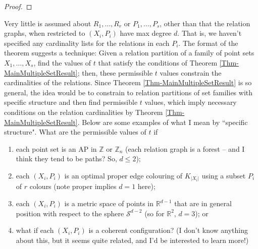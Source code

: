 \documentclass[12pt]{article}
\newcommand{\R}{\mathbb{R}}
\newcommand{\Z}{\mathbb{Z}}
\DeclarePairedDelimiter\ceil{\lceil}{\rceil}
\DeclarePairedDelimiter\floor{\lfloor}{\rfloor}
\theoremstyle{definition}
\begin{document}
\begin{proof}
	\end{proof}
	
	Very little is assumed about $R_1,\ldots, R_r$ or $P_1,\ldots, P_s$, other than that the relation graphs, when restricted to $(X_i,P_i)$ have max degree $d$.  That is, we haven't specified any cardinality lists for the relations in each $P_i$.  The format of the theorem suggests a technique: Given a relation partition of a family of point sets $X_1, \ldots, X_s$, find the values of $t$ that satisfy the conditions of Theorem \ref{Thm-MainMultipleSetResult}; then, these permissible $t$ values constrain the cardinalities of the relations.  Since Theorem \ref{Thm-MainMultipleSetResult} is so general, the idea would be to constrain to relation partitions of set families with specific structure and then find permissible $t$ values, which imply necessary conditions on the relation cardinalities by Theorem \ref{Thm-MainMultipleSetResult}.  Below are some examples of what I mean by ``specific structure".  What are the permissible values of $t$ if 
	\begin{enumerate}
		\item each point set is an AP in $\Z$ or $\Z_n$ (each relation graph is a forest -- and I think they tend to be paths? So, $d \leq 2$);
		\item each $(X_i,P_i)$ is an optimal proper edge colouring of $K_{|X_i|}$ using a subset $P_i$ of $r$ colours (note proper implies $d=1$ here);
		\item each $(X_i,P_i)$ is a metric space of points in $\R^{d-1}$ that are in general position with respect to the sphere $\mathcal{S}^{d-2}$ (so for $\R^2$, $d=3$); or
		\item what if each $(X_i,P_i)$ is a coherent configuration?  (I don't know anything about this, but it seems quite related, and I'd be interested to learn more!)
	\end{enumerate}
	
\end{document}
